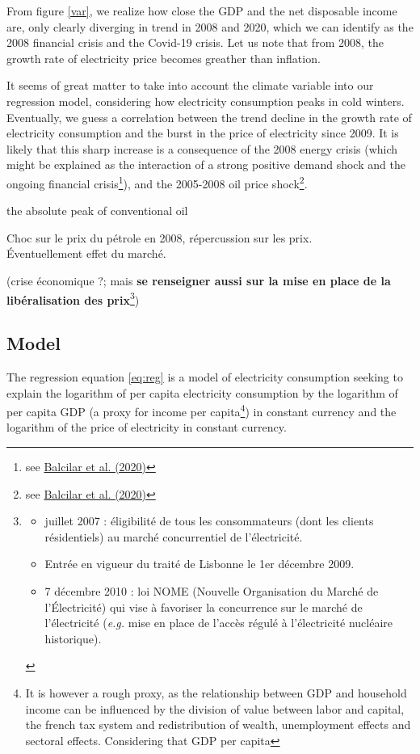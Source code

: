 From figure \ref{var}, we realize how close the GDP and the net disposable income are, only clearly diverging in trend in 2008 and 2020, which we can identify as the 2008 financial crisis and the Covid-19 crisis. Let us note that from 2008, the growth rate of electricity price becomes greather than inflation.

It seems of great matter to take into account the climate variable into our regression model, considering how electricity consumption peaks in cold winters. Eventually, we guess a correlation between the trend decline in the growth rate of electricity consumption and the burst in the price of electricity since 2009. It is likely that this sharp increase is a consequence of the 2008 energy crisis (which might be explained as the interaction of a strong positive demand shock and the ongoing financial crisis\footnote{see \href{https://www.sciencedirect.com/science/article/abs/pii/S0140988319303195}{Balcilar et al. (2020)}}), and the 2005-2008 oil price shock\footnote{see \href{https://www.sciencedirect.com/science/article/abs/pii/S0140988319303195}{Balcilar et al. (2020)}}.

the absolute peak of conventional oil

Choc sur le prix du pétrole en 2008, répercussion sur les prix.\\
Éventuellement effet du marché.

(crise économique ?; mais \textbf{se renseigner aussi sur la mise en place de la libéralisation des prix}\footnote{
    \begin{itemize}
        \item juillet 2007 : éligibilité de tous les consommateurs (dont les clients résidentiels) au marché concurrentiel de l’électricité.
        \item Entrée en vigueur du traité de Lisbonne le 1er décembre 2009.
        \item 7 décembre 2010 : loi NOME (Nouvelle Organisation du Marché de l’Électricité) qui vise à favoriser la concurrence sur le marché de l’électricité (\textit{e.g.} mise en place de l'accès régulé à l'électricité nucléaire historique).
\end{itemize}})

\subsection{Model}
The regression equation \eqref{eq:reg} is a model of electricity consumption seeking to explain the logarithm of per capita electricity consumption by the logarithm of per capita GDP (a proxy for income per capita\footnote{It is however a rough proxy, as the relationship between GDP and household income can be influenced by the division of value between labor and capital, the french tax system and redistribution of wealth, unemployment effects and sectoral effects.
Considering that GDP per capita}) in constant currency and the logarithm of the price of electricity in constant currency. 

